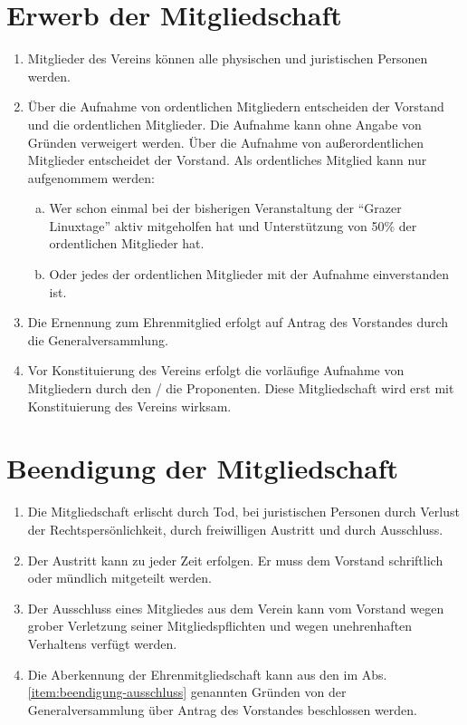 \documentclass[a4paper,12pt]{article}
\begin{document}
\section{Erwerb der Mitgliedschaft} %
\label{sec:Mitgliedschaft-Erwerb}
\begin{enumerate}
\item Mitglieder des Vereins können alle physischen und juristischen Personen werden.
\item  Über die Aufnahme von ordentlichen Mitgliedern entscheiden der Vorstand und die ordentlichen Mitglieder. Die Aufnahme kann ohne Angabe von Gründen verweigert werden. Über die Aufnahme von außerordentlichen Mitglieder entscheidet der Vorstand. Als ordentliches Mitglied kann nur aufgenommem werden:
\begin{enumerate}[(a)]
  \item Wer schon einmal bei der bisherigen Veranstaltung der \enquote{Grazer Linuxtage} aktiv mitgeholfen hat und Unterstützung von 50\% der ordentlichen Mitglieder hat.
  \item Oder jedes der ordentlichen Mitglieder mit der Aufnahme einverstanden ist.
\end{enumerate}
\item Die Ernennung zum Ehrenmitglied erfolgt auf Antrag des Vorstandes durch die Generalversammlung.
\item Vor Konstituierung des Vereins erfolgt die vorläufige Aufnahme von Mitgliedern durch den / die Proponenten. Diese Mitgliedschaft wird erst mit Konstituierung des Vereins wirksam.
\end{enumerate}

\section{Beendigung der Mitgliedschaft} %
\label{sec:Mitgliedschaft-Beendigung}
\begin{enumerate}
\item Die Mitgliedschaft erlischt durch Tod, bei juristischen Personen durch Verlust der Rechtspersönlichkeit, durch freiwilligen Austritt und durch Ausschluss.
\item Der Austritt kann zu jeder Zeit erfolgen. Er muss dem Vorstand schriftlich oder mündlich mitgeteilt werden.
\item\label{item:beendigung-ausschluss} Der Ausschluss eines Mitgliedes aus dem Verein kann vom Vorstand wegen grober Verletzung seiner Mitgliedspflichten und wegen unehrenhaften Verhaltens verfügt werden.
\item Die Aberkennung der Ehrenmitgliedschaft kann aus den im Abs. \ref{item:beendigung-ausschluss} genannten Gründen von der Generalversammlung über Antrag des Vorstandes beschlossen werden.
\end{enumerate}
\end{document}
